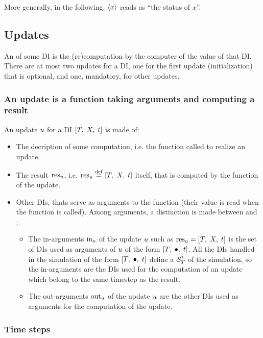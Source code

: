 More generally, in the following, $\left< x \right>$ reads as ``the status of $x$''.


\subsection{Updates}

An  of some DI is the (re)computation by the \CxSOM computer of the value of that DI. There are at most two updates for a DI, one for the first update (initialization) that is optional, and one, mandatory, for other updates.

\subsubsection{An update is a function taking arguments and computing a result \label{sec:update}}

An update $u$ for a DI $\left[ T,\;X,\;t \right]$ is made of:
\begin{itemize}
\item The decription of some computation, i.e. the function called to realize an update.
\item The result ${\mathrm{res}}_{u}$, i.e. ${{\mathrm{res}}_{u}}\;{\stackrel{\mathrm{def}}{=}}\;{\left[ T,\;X,\;t \right]}$ itself, that is computed by the function of the update.
\item Other DIs, thats serve as arguments to the function (their value is read when the function is called). Among arguments, a distinction is made between  and :
  \begin{itemize}
  \item The in-arguments ${\mathrm{in}}_{u}$ of the update $u$ such as ${{\mathrm{res}}_{u}} = {\left[ T,\;X,\;t \right]}$ is the set of DIs used as arguments of $u$ of the form $\left[ T,\;\bullet,\;t \right]$. All the DIs handled in the simulation of the form $\left[ T,\;\bullet,\;t \right]$ define a  ${{\cal S}}_{T}^{t}$ of the simulation, so the in-arguments are the DIs used for the computation of an update which belong to the same timestep as the result.
  \item The out-arguments  ${\mathrm{out}}_{u}$ of the update $u$ are the other DIs used as arguments for the computation of the update.
  \end{itemize}
\end{itemize}

\subsubsection{Time steps}

